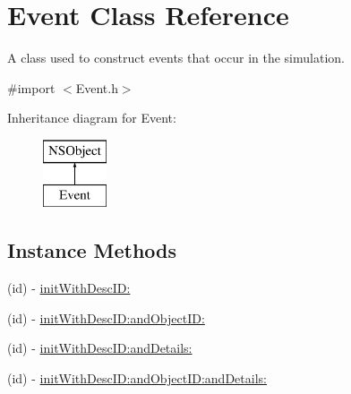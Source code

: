 \hypertarget{interface_event}{\section{Event Class Reference}
\label{interface_event}
}


A class used to construct events that occur in the simulation.  




{\ttfamily \#import $<$Event.\-h$>$}

Inheritance diagram for Event\-:\begin{figure}[H]
\begin{center}
\leavevmode
\includegraphics[height=2.000000cm]{interface_event}
\end{center}
\end{figure}
\subsection*{Instance Methods}
\begin{DoxyCompactItemize}
\item 
(id) -\/ \hyperlink{interface_event_a9f84a217411ee0ffbaa3def1332ec8bd}{init\-With\-Desc\-I\-D\-:}
\item 
(id) -\/ \hyperlink{interface_event_ae719cd1948e9cfa11caf1eea81012b4c}{init\-With\-Desc\-I\-D\-:and\-Object\-I\-D\-:}
\item 
(id) -\/ \hyperlink{interface_event_ae0b25c192d084ad864831170aac1d542}{init\-With\-Desc\-I\-D\-:and\-Details\-:}
\item 
(id) -\/ \hyperlink{interface_event_ae185f9bf45394b5d54c542085c91b133}{init\-With\-Desc\-I\-D\-:and\-Object\-I\-D\-:and\-Details\-:}
\end{DoxyCompactItemize}
